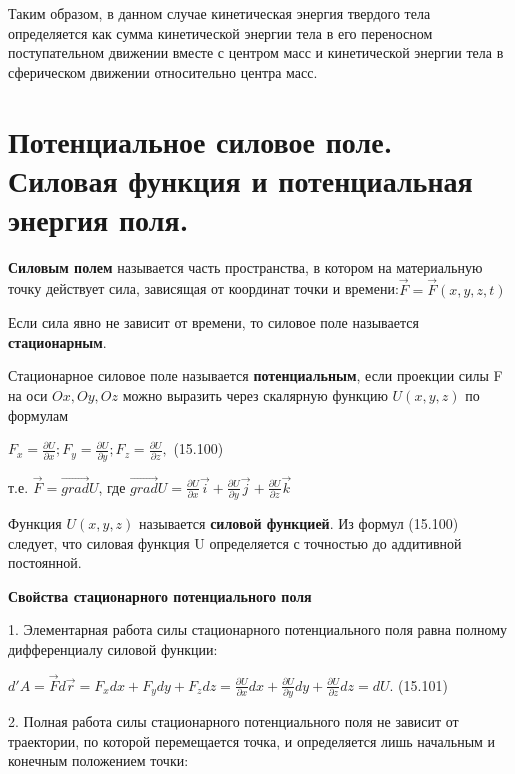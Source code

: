 {\begin{center}
\begin{figure}[H]
    \end{figure}
    \par Таким  образом,  в  данном  случае  кинетическая  энергия  твердого  тела определяется как сумма кинетической энергии тела в его переносном поступательном движении вместе с центром масс и кинетической энергии тела в сферическом движении относительно центра масс.
\end{center}
\section{Потенциальное силовое поле. Силовая функция и потенциальная энергия поля.}
\begin{center}
    \par \textbf{Силовым полем} называется часть пространства, в котором на материальную точку действует сила, зависящая от координат точки и времени:$ \Vec{F} = \Vec{F} (x,y,z,t)$
    
    \par Если  сила  явно  не  зависит  от  времени,  то  силовое  поле  называется \textbf{стационарным}.

    \par Стационарное силовое поле называется \textbf{потенциальным}, если проекции силы F на оси ${ Ox, Oy, Oz }$ можно выразить через скалярную функцию ${U(x, y, z)}$ по формулам 

    \par $ F_{x} = \frac{\partial{U}}{\partial{x}};  F_{y} = \frac{\partial{U}}{\partial{y}};  F_{z} = \frac{\partial{U}}{\partial{z}},$ \qquad (15.100)

    \par т.е. $ \Vec{F} = \vec{grad}U $, где $\vec{grad}U = \frac{\partial{U}}{\partial{x}} \vec{i} + \frac{\partial{U}}{\partial{y}} \vec{j} + \frac{\partial{U}}{\partial{z}} \vec{k} $

    \par Функция  ${U(x,  y,  z)}$  называется  \textbf{силовой  функцией}.  Из  формул  (15.100) следует,  что  силовая  функция  U  определяется  с  точностью  до  аддитивной постоянной.

    \par \textbf{Свойства стационарного потенциального поля}

    \par 1. Элементарная работа силы стационарного потенциального поля равна полному дифференциалу силовой функции:

    \par $d'A = \vec{F}d\vec{r} = F_{x}dx + F_{y}dy+F_{z}dz =\frac{\partial{U}}{\partial{x}} dx + \frac{\partial{U}}{\partial{y}} dy + \frac{\partial{U}}{\partial{z}} dz = dU. $ \qquad (15.101)
    \par 2. Полная работа силы стационарного потенциального поля не зависит от траектории, по которой перемещается точка, и определяется лишь начальным и конечным положением точки:


\end{center}}
